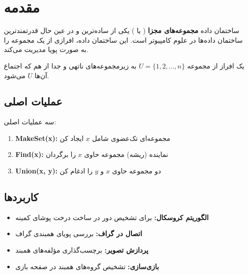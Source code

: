 \documentclass{matinbook}
\begin{document}
    \section{مقدمه}
    
    ساختمان داده \textbf{مجموعه‌های مجزا}
    ( یا )
    یکی از ساده‌ترین و در عین حال قدرتمندترین
    ساختمان داده‌ها در علوم کامپیوتر است.
    این ساختمان داده، افرازی از یک مجموعه
    را به صورت پویا مدیریت می‌کند.
    
    \begin{definition}
        یک افراز از مجموعه $U = \{1, 2, \ldots, n\}$
        به زیرمجموعه‌های ناتهی و جدا از هم
        که اجتماع آن‌ها $U$ می‌شود.
        \label{def:disjoint-sets}
    \end{definition}
    
    \subsection{عملیات اصلی}
    
    \begin{definition}
        سه عملیات اصلی:
        \begin{enumerate}
            \item \textbf{MakeSet(x):}
            مجموعه‌ای تک‌عضوی شامل $x$ ایجاد کن
            \item \textbf{Find(x):}
            نماینده (ریشه) مجموعه حاوی $x$ را برگردان
            \item \textbf{Union(x, y):}
            دو مجموعه حاوی $x$ و $y$ را ادغام کن
        \end{enumerate}
        \label{def:union-find-operations}
    \end{definition}
    
    \subsection{کاربردها}
    
    \begin{itemize}
        \item \textbf{الگوریتم کروسکال:}
        برای تشخیص دور در ساخت درخت پوشای کمینه
        \item \textbf{اتصال در گراف:}
        بررسی پویای همبندی گراف
        \item \textbf{پردازش تصویر:}
        برچسب‌گذاری مؤلفه‌های همبند
        \item \textbf{بازی‌سازی:}
        تشخیص گروه‌های همبند در صفحه بازی
    \end{itemize}
    
\end{document}
